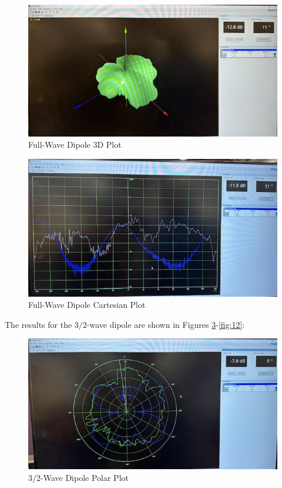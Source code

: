 \documentclass[
	letterpaper, %
	10pt, %
]{CSUniSchoolLabReport}
\begin{document}
\begin{figure}[H]
  \centering
  \includegraphics[width=.8\textwidth]{Figures/Lab Five/FWD-3D.jpg}
  \caption{Full-Wave Dipole 3D Plot}
  \label{fig:7}
\end{figure}

\begin{figure}[H]
  \centering
  \includegraphics[width=.8\textwidth]{Figures/Lab Five/FWD-XY.jpg}
  \caption{Full-Wave Dipole Cartesian Plot}
  \label{fig:8}
\end{figure}

The results for the $3/2$-wave dipole are shown in Figures \ref{fig:9}-\ref{fig:12}:

\begin{figure}[H]
  \centering
  \includegraphics[width=.8\textwidth]{Figures/Lab Five/3-2WD-Polar.jpg}
  \caption{$3/2$-Wave Dipole Polar Plot}
  \label{fig:9}
\end{figure}
\end{document}
